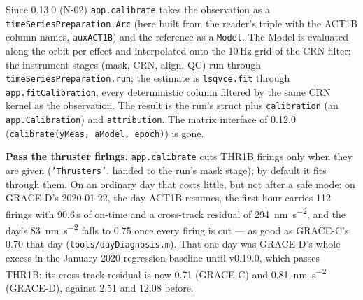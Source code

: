\documentclass[11pt,a4paper]{report}
\begin{document}
\noindent Since 0.13.0 (N-02) \texttt{app.calibrate} takes the observation as a
\texttt{timeSeriesPreparation.Arc} (here built from the reader's triple with the ACT1B column names,
\texttt{auxACT1B}) and the reference as a \texttt{Model}. The Model is evaluated along the orbit per
effect and interpolated onto the 10\,Hz grid of the CRN filter; the instrument stages (mask, CRN,
align, QC) run through \texttt{timeSeriesPreparation.run}; the estimate is \texttt{lsqvce.fit}
through \texttt{app.fitCalibration}, every deterministic column filtered by the same CRN kernel as
the observation. The result is the run's struct plus \texttt{calibration} (an
\texttt{app.Calibration}) and \texttt{attribution}. The matrix interface of 0.12.0
(\texttt{calibrate(yMeas, aModel, epoch)}) is gone.

\textbf{Pass the thruster firings.} \texttt{app.calibrate} cuts THR1B firings only when they are given
(\texttt{'Thrusters'}, handed to the run's mask stage); by default it fits through them. On an
ordinary day that costs little, but not after a safe mode: on GRACE-D's 2020-01-22, the day ACT1B
resumes, the first hour carries 112 firings with 90.6\,s of on-time and a cross-track residual of
\SI{294}{\nano\metre\per\second\squared}, and the day's \SI{83}{\nano\metre\per\second\squared} falls
to \SI{0.75}{} once every firing is cut --- as good as GRACE-C's \SI{0.70}{} that day
(\texttt{tools/dayDiagnosis.m}). That one day was GRACE-D's whole excess in the January 2020 regression
baseline until v0.19.0, which passes THR1B: its cross-track residual is now \SI{0.71}{} (GRACE-C) and
\SI{0.81}{\nano\metre\per\second\squared} (GRACE-D), against \SI{2.51}{} and \SI{12.08}{} before.
\end{document}

